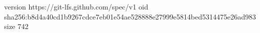 version https://git-lfs.github.com/spec/v1
oid sha256:b8d4a40cd1b9267cdce7eb01e54ae528888e27999e5814bed5314475e26ad983
size 742

